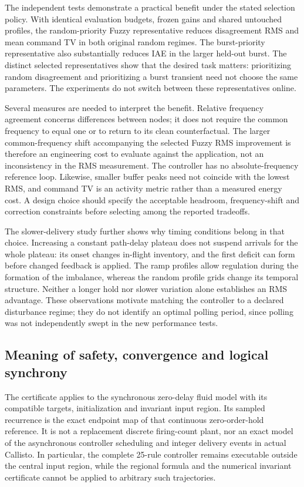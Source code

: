 The independent tests demonstrate a practical benefit under the stated
selection policy. With identical evaluation budgets, frozen gains and
shared untouched profiles, the random-priority Fuzzy representative
reduces disagreement RMS and mean command TV in both original random
regimes. The burst-priority representative also substantially reduces
IAE in the larger held-out burst. The distinct selected representatives
show that the desired task matters: prioritizing random disagreement
and prioritizing a burst transient need not choose the same parameters.
The experiments do not switch between these representatives online.

Several measures are needed to interpret the benefit. Relative
frequency agreement concerns differences between nodes; it does not
require the common frequency to equal one or to return to its clean
counterfactual. The larger common-frequency shift accompanying the
selected Fuzzy RMS improvement is therefore an engineering cost to
evaluate against the application, not an inconsistency in the RMS
measurement. The controller has no absolute-frequency reference loop.
Likewise, smaller buffer peaks need not coincide with the lowest RMS,
and command TV is an activity metric rather than a measured energy
cost. A design choice should specify the acceptable headroom,
frequency-shift and correction constraints before selecting among the
reported tradeoffs.

The slower-delivery study further shows why timing conditions belong
in that choice. Increasing a constant path-delay plateau does not
suspend arrivals for the whole plateau: its onset changes in-flight
inventory, and the first deficit can form before changed feedback is
applied. The ramp profiles allow regulation during the formation of
the imbalance, whereas the random profile grids change its temporal
structure. Neither a longer hold nor slower variation alone establishes
an RMS advantage. These observations motivate matching the controller
to a declared disturbance regime; they do not identify an optimal
polling period, since polling was not independently swept in the new
performance tests.

\subsection{Meaning of safety, convergence and logical synchrony}
\label{subsec:discussion_scope}

The certificate applies to the synchronous zero-delay fluid model with
its compatible targets, initialization and invariant input region.
Its sampled recurrence is the exact endpoint map of that continuous
zero-order-hold reference. It is not a replacement discrete firing-count
plant, nor an exact model of the asynchronous controller scheduling
and integer delivery events in actual Callisto. In particular, the
complete 25-rule controller remains executable outside the central
input region, while the regional formula and the numerical invariant
certificate cannot be applied to arbitrary such trajectories.

